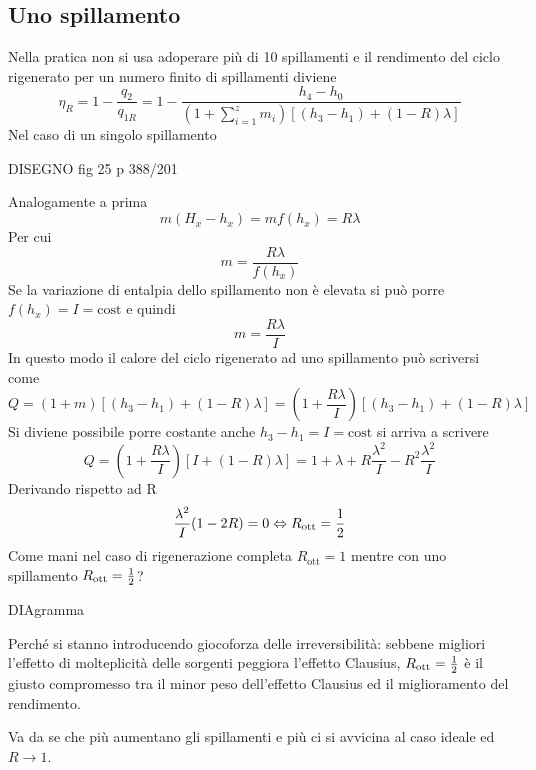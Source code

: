 \subsection{Uno spillamento}
\begin{adjustwidth}{2in}{}	
	Nella pratica non si usa adoperare più di 10 spillamenti e il rendimento del ciclo rigenerato per un numero finito di spillamenti diviene 
	\[\eta_R = 1- \dfrac{q_2}{q_{1R}} = 1 - \dfrac{h_4-h_0}{(1+\sum_{i=1}^{z}m_i)[(h_3-h_1) + (1-R)\lambda]}\]
	Nel caso di un singolo spillamento
	
	DISEGNO fig 25 p 388/201
	
	Analogamente a prima 
	\[m(H_x-h_x) = mf(h_x) = R\lambda\]
	Per cui
	\[m = \dfrac{R\lambda}{f(h_x)}\]
	Se la variazione di entalpia dello spillamento non è elevata si può porre $f(h_x) = I = \text{cost}$ e quindi
	\[m = \dfrac{R\lambda}{I}\]
	In questo modo il calore del ciclo rigenerato ad uno spillamento può scriversi come 
	\[Q = (1+m)[(h_3-h_1) + (1-R)\lambda] = \left(1 + \dfrac{R\lambda}{I}\right)[(h_3-h_1) + (1-R)\lambda]\]
	Si diviene possibile porre costante anche $h_3-h_1 = I = \text{cost}$ si arriva a scrivere
	\[Q = \left(1 + \dfrac{R\lambda}{I}\right)[I + (1-R)\lambda] = 1 + \lambda + R\dfrac{\lambda^2}{I} - R^2\dfrac{\lambda^2}{I}\]
	Derivando rispetto ad R
	\[\dfrac{\lambda^2}{I}(1-2R) = 0 \Leftrightarrow R_{\text{ott}} = {1\over2}\]
	Come mani nel caso di rigenerazione completa $R_{\text{ott}} = 1$ mentre con uno spillamento $R_{\text{ott}} = {1\over2}$?
	
	DIAgramma 
	
	Perché si stanno introducendo giocoforza delle irreversibilità: sebbene migliori l'effetto di molteplicità delle sorgenti peggiora l'effetto Clausius, $R_{\text{ott}} = {1\over2}$ è il giusto compromesso tra il minor peso dell'effetto Clausius ed il miglioramento del rendimento.
	
	Va da se che più aumentano gli spillamenti e più ci si avvicina al caso ideale ed $R\rightarrow1$.
\end{adjustwidth} 

	
